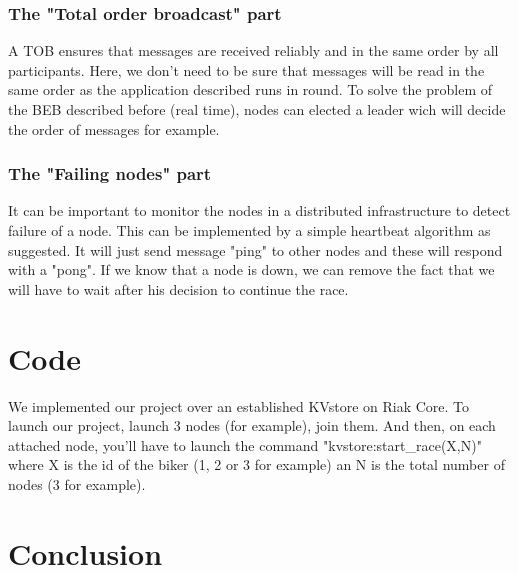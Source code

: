 \documentclass[a4paper, 11pt]{article}
\begin{document}
\subsubsection{The "Total order broadcast" part}
A TOB ensures that messages are received reliably and in the same order by all participants. Here, we don't need to be sure that messages will be read in the same order as the application described runs in round. To solve the problem of the BEB described before (real time), nodes can elected a leader wich will decide the order of messages for example.

\subsubsection{The "Failing nodes" part}
It can be important to monitor the nodes in a distributed infrastructure to detect failure of a node. This can be implemented by a simple heartbeat algorithm as suggested. It will just send message "ping" to other nodes and these will respond with a "pong". If we know that a node is down, we can remove the fact that we will have to wait after his decision to continue the race.

\section{Code}

We implemented our project over an established KVstore on Riak Core. To launch our project, launch 3 nodes (for example), join them. And then, on each attached node, you'll have to launch the command "kvstore:start\_race(X,N)" where X is the id of the biker (1, 2 or 3 for example) an N is the total number of nodes (3 for example).  

\section{Conclusion}
\end{document}
